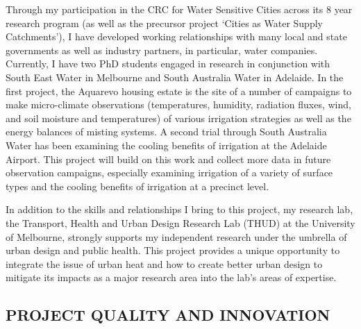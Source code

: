 Through my participation in the CRC for Water Sensitive Cities across its 8 year research program (as well as the precursor project `Cities as Water Supply Catchments'), I have developed working relationships with many local and state governments as well as industry partners, in particular, water companies. Currently, I have two PhD students engaged in research in conjunction with South East Water in Melbourne and South Australia Water in Adelaide. In the first project, the Aquarevo housing estate\cite{SEW2020} is the site of a number of campaigns to make micro-climate observations (temperatures, humidity, radiation fluxes, wind, and soil moisture and temperatures) of various irrigation strategies as well as the energy balances of misting systems. A second trial through South Australia Water has been examining the cooling benefits of irrigation at the Adelaide Airport\cite{CRCWCS2018,Ingleton2020}. This project will build on this work and collect more data in future observation campaigns, especially examining irrigation of a variety of surface types and the cooling benefits of irrigation at a precinct level.

In addition to the skills and relationships I bring to this project, my research lab, the Transport, Health and Urban Design Research Lab (THUD) at the University of Melbourne, strongly supports my independent research under the umbrella of urban design and public health. This project provides a unique opportunity to integrate the issue of urban heat and how to create better urban design to mitigate its impacts as a major research area into the lab's areas of expertise.




\subsection*{\TitleFont PROJECT QUALITY AND INNOVATION}


